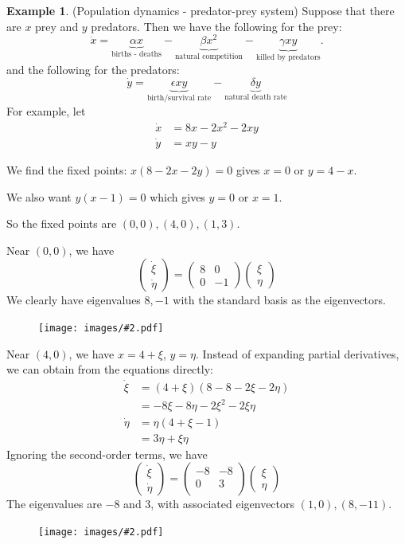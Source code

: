 \documentclass[a4paper]{article}
\theoremstyle{definition}
\newtheorem*{eg}{Example}
\newcommand{\img}[2][]{\begin{figure}[ht]\centering\texttt{[image: images/\#2.pdf]}\end{figure}}
\begin{document}
\begin{eg}
  (Population dynamics - predator-prey system) Suppose that there are $x$ prey and $y$ predators. Then we have the following for the prey:
\[
\dot x = \underbrace{\alpha x}_{\text{births - deaths}} - \underbrace{\beta x^2}_{\text{natural competition}} - \underbrace{\gamma xy}_{\text{killed by predators}}.
\]
and the following for the predators:
\[
\dot y = \underbrace{\epsilon xy}_{\text{birth/survival rate}} - \underbrace{\delta y}_{\text{natural death rate}}
\]
For example, let
\begin{align*}
  \dot x &= 8x - 2x^2 - 2xy\\
  \dot y &= xy - y
\end{align*}

We find the fixed points: $x(8 - 2x - 2y) = 0$ gives $x = 0$ or $y = 4 - x$.

We also want $y(x - 1) = 0$ which gives $y = 0$ or $x = 1$.

So the fixed points are $(0, 0), (4, 0), (1, 3)$.

Near $(0, 0)$, we have
\[
\begin{pmatrix}
  \dot \xi\\\dot \eta
\end{pmatrix}=
\begin{pmatrix}
  8 & 0\\
  0 & -1
\end{pmatrix}
\begin{pmatrix}
  \xi\\
  \eta
\end{pmatrix}
\]
We clearly have eigenvalues $8, -1$ with the standard basis as the eigenvectors.

\img{de_28}

Near $(4, 0)$, we have $x = 4 + \xi$, $y = \eta$. Instead of expanding partial derivatives, we can obtain from the equations directly:
\begin{align*}
  \dot\xi &= (4 + \xi)(8 - 8 - 2\xi - 2\eta)\\
  &= - 8\xi - 8\eta -2\xi^2 - 2\xi\eta\\
  \dot\eta &= \eta(4 + \xi - 1)\\
  &= 3\eta + \xi\eta
\end{align*}
Ignoring the second-order terms, we have
\[
\begin{pmatrix}
\dot\xi\\\dot\eta
\end{pmatrix} = 
\begin{pmatrix}
  -8 & -8 \\
  0 & 3\\
\end{pmatrix}
\begin{pmatrix}
  \xi\\\eta
\end{pmatrix}
\]
The eigenvalues are $-8$ and $3$, with associated eigenvectors $(1, 0), (8, -11)$.
\newpage %
\img{de_29}


\end{eg}
\end{document}
